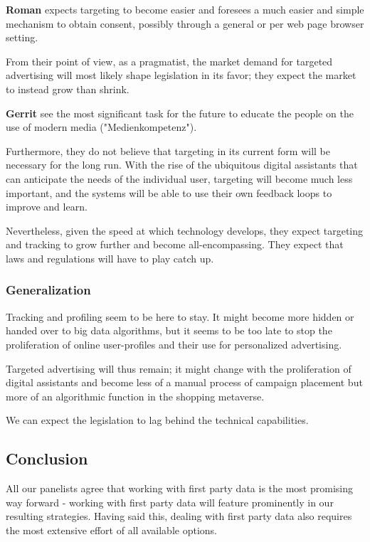 \textbf{Roman} expects targeting to become easier and foresees a much easier and simple mechanism to obtain consent, possibly through a general or per web page browser setting.

From their point of view, as a pragmatist, the market demand for targeted advertising will most likely shape legislation in its favor; they expect the market to instead grow than shrink.

\textbf{Gerrit} see the most significant task for the future to educate the people on the use of modern media ("Medienkompetenz").

Furthermore, they do not believe that targeting in its current form will be necessary for the long run. With the rise of the ubiquitous digital assistants that can anticipate the needs of the individual user, targeting will become much less important, and the systems will be able to use their own feedback loops to improve and learn.

Nevertheless, given the speed at which technology develops, they expect targeting and tracking to grow further and become all-encompassing. They expect that laws and regulations will have to play catch up.

\subsubsection{Generalization}

Tracking and profiling seem to be here to stay. It might become more hidden or handed over to big data algorithms, but it seems to be too late to stop the proliferation of online user-profiles and their use for personalized advertising.

Targeted advertising will thus remain; it might change with the proliferation of digital assistants and become less of a manual process of campaign placement but more of an algorithmic function in the shopping metaverse.

We can expect the legislation to lag behind the technical capabilities.

\subsection{Conclusion}

All our panelists agree that working with first party data is the most promising way forward - working with first party data will feature prominently in our resulting strategies. Having said this, dealing with first party data also requires the most extensive effort of all available options. 

